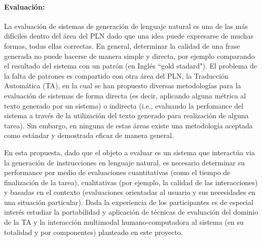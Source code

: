 \paragraph{Evaluaci\'on:} La evaluaci\'on de sistemas de generaci\'on de lenguaje natural es una de las m\'as dif\'iciles dentro del \'area del PLN dado que una idea puede expresarse de muchas formas, todas ellas correctas. En general, determinar la calidad de una frase generada no puede hacerse de manera simple y directa, por ejemplo comparando el resultado del sistema con un patr\'on (en Ingl\'es ``gold stadard"). El problema de la falta de patrones es compartido con otra \'area del PLN, la Traducci\'on Autom\'atica (TA), en la cual se han propuesto diversas metodolog\'ias para la evaluaci\'on de sistemas de forma directa (es decir, aplicando alguna m\'etrica al texto generado por un sistema) o indirecta (i.e., evaluando la perfomance del sistema a trav\'es de la utilizaci\'on del texto generado para realizaci\'on de alguna tarea). Sin embargo, en ninguna de estas \'areas existe una metodolog\'ia aceptada como est\'andar y demostrada eficaz de manera general.

En esta propuesta, dado que el objeto a evaluar es un sistema que interact\'ua via la generaci\'on de instrucciones en lenguaje natural, es necesario determinar su performance por medio de evaluaciones cuantitativas (como el tiempo de finalizaci\'on de la tarea), cualitativas (por ejemplo, la calidad de las interacciones) y basadas en el contexto (evaluaciones orientadas al usuario y sus necesidades en una situaci\'on particular). Dada la experiencia de los participantes es de especial inter\'es estudiar la  portabilidad y aplicaci\'on de t\'ecnicas de evaluaci\'on del dominio de la TA y la interacci\'on multimodal humano-computadora al sistema (en su totalidad y por componentes) planteado en este proyecto.


